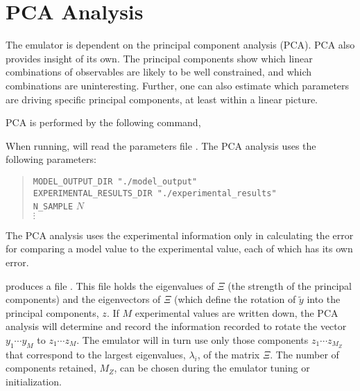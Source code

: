 \section{PCA Analysis}

The emulator is dependent on the principal component analysis (PCA). PCA also provides insight of its own. The principal components show which linear combinations of observables are likely to be well constrained, and which combinations are uninteresting. Further, one can also estimate which parameters are driving specific principal components, at least within a linear picture.

PCA is performed by the following command,


When running,  will read the parameters file . The PCA analysis uses the following parameters:

\vspace*{-8pt}\begin{quote}
{\tt MODEL\_OUTPUT\_DIR "./model\_output"}\\
{\tt EXPERIMENTAL\_RESULTS\_DIR "./experimental\_results"}\\
{\tt N\_SAMPLE} $N$\\
$\vdots$
\end{quote}\vspace*{-8pt}
The PCA analysis uses the experimental information only in calculating the error for comparing a model value to the experimental value, each of which has its own error.

 produces a file . This file holds the eigenvalues of $\Xi$ (the strength of the principal components) and the eigenvectors of $\Xi$ (which define the rotation of $\tilde{y}$ into the principal components, $z$. If $M$ experimental values are written down, the PCA analysis will determine and record the information recorded to rotate the vector $y_1\cdots y_M$ to $z_1\cdots z_M$. The emulator will in turn use only those components $z_1\cdots z_{M_Z}$ that correspond to the largest eigenvalues, $\lambda_i$, of the matrix $\Xi$. The number of components retained, $M_Z$, can be chosen during the emulator tuning or initialization.

